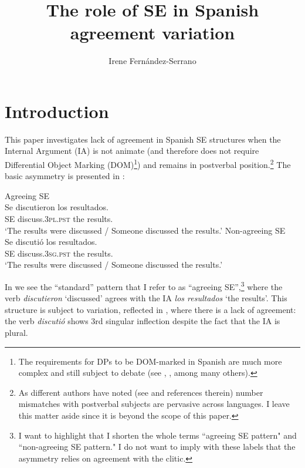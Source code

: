 \documentclass[output=paper,colorlinks,citecolor=brown]{langscibook}
\author{{Irene Fernández-Serrano}\orcid{https://orcid.org/0000-0003-0343-0586}\affiliation{Universitat Aut\`onoma de Barcelona}}
\title{The role of SE in Spanish agreement variation}
\begin{document}
\maketitle

\section{Introduction}

This paper investigates lack of agreement in Spanish SE structures when the Internal Argument (IA) is not animate (and therefore does not require Differential Object Marking (DOM)\footnote{\label{05:fn:fernandez:1}The requirements for DPs to be DOM-marked in Spanish are much more complex and still subject to debate (see \citealt{Leonetti2004}, \citealt{Rodriguez-Mondonedo2007}, \citealt{Lopez2012} among many others).}) and remains in postverbal position.\footnote{As different authors have noted (see \citealt{OrtegaSantos2008} and references therein) number mismatches with postverbal subjects are pervasive across languages. I leave this matter aside since it is beyond the scope of this paper.} The basic asymmetry is presented in :

\ea \label{ex:05:1}
\ea \label{ex:05:1a}
        Agreeing SE \\
        \gll Se discutieron los resultados.  \\
            SE discuss.\textsc{3pl.pst} the results. \\
        \glt `The results were discussed / Someone discussed the results.'
\ex \label{ex:05:1b}
        Non-agreeing SE \\
        \gll Se discutió los resultados.  \\
            SE discuss.\textsc{3sg.pst} the results. \\
        \glt `The results were discussed / Someone discussed the results.'
\z
\z

In  we see the ``standard'' pattern that I refer to as ``agreeing SE'',\footnote{I want to highlight that I shorten the whole terms ``agreeing SE pattern" and ``non-agreeing SE pattern." I do not want to imply with these labels that the asymmetry relies on agreement with the clitic.} where the verb \textit{discutieron} `discussed' agrees with the IA \textit{los resultados} `the results'. This structure is subject to variation, reflected in , where there is a lack of agreement: the verb \textit{discutió} shows 3rd singular inflection despite the fact that the IA is plural.
\end{document}
